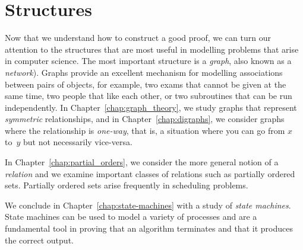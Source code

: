 \part{Structures}
\label{part:structures}

Now that we understand how to construct a good proof, we can turn our
attention to the structures that are most useful in modelling problems
that arise in computer science.  The most important structure is a
\emph{graph}, also known as a \emph{network}).  Graphs provide an
excellent mechanism for modelling associations between pairs of
objects, for example, two exams that cannot be given at the same time,
two people that like each other, or two subroutines that can be run
independently.  In Chapter~\ref{chap:graph_theory}, we study graphs
that represent \emph{symmetric} relationships, and in
Chapter~\ref{chap:digraphs}, we consider graphs where the relationship
is \emph{one-way}, that is, a situation where you can go from $x$
to~$y$ but not necessarily vice-versa.

In Chapter~\ref{chap:partial_orders}, we consider the more general
notion of a \emph{relation} and we examine important classes of
relations such as partially ordered sets.  Partially ordered sets
arise frequently in scheduling problems.

We conclude in Chapter~\ref{chap:state-machines} with a study of
\emph{state machines}.  State machines can be used to model a variety
of processes and are a fundamental tool in proving that an algorithm
terminates and that it produces the correct output.

\endinput
